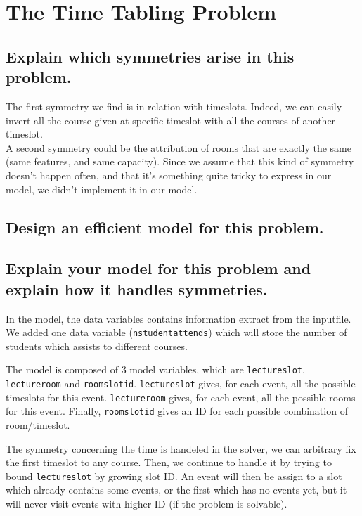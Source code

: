\documentclass[a4paper ,12pt,french]{article}
\begin{document}
\section{The Time Tabling Problem}
\subsection{Explain which symmetries arise in this problem.}

The first symmetry we find is in relation with timeslots. Indeed, we can easily invert all the course given at specific timeslot with all the courses of another timeslot.\\

A second symmetry could be the attribution of rooms that are exactly the same (same features, and same capacity). Since we assume that this kind of symmetry doesn't happen often, and that it's something quite tricky to express in our model, we didn't implement it in our model.

\subsection{Design an efficient model for this problem.}





\subsection{Explain your model for this problem and explain how it handles symmetries.}

In the model, the data variables contains information extract from the inputfile. We added one data variable (\texttt{nstudentattends}) which will store the number of students which assists to different courses.

The model is composed of 3 model variables, which are \texttt{lectureslot}, \texttt{lectureroom} and \texttt{roomslotid}. \texttt{lectureslot} gives, for each event, all the possible timeslots for this event. \texttt{lectureroom} gives, for each event, all the possible rooms for this event. Finally, \texttt{roomslotid} gives an ID for each possible combination of room/timeslot.



The symmetry concerning the time is handeled in the solver, we can arbitrary fix the first timeslot to any course. Then, we continue to handle it by trying to bound \texttt{lectureslot} by growing slot ID. An event will then be assign to a slot which already contains some events, or the first which has no events yet, but it will never visit events with higher ID (if the problem is solvable).
\end{document}
